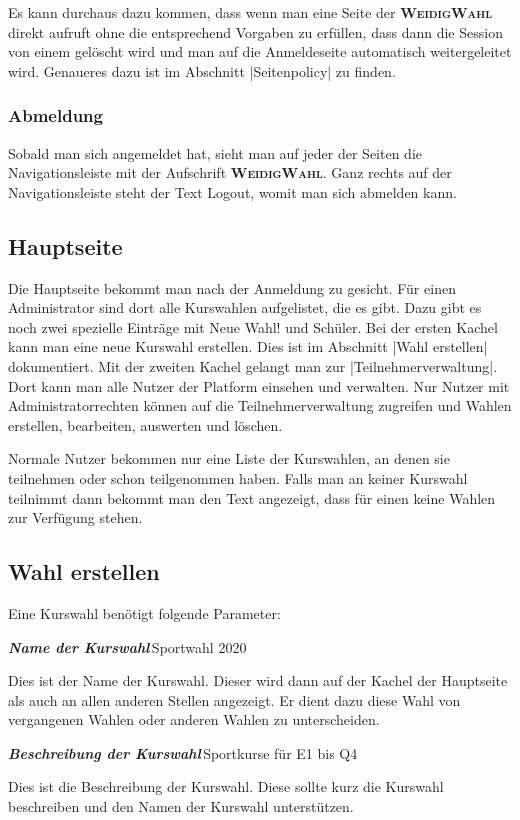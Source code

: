 \documentclass[ngerman]{ltxdoc}
\newcommand{\DescribeOption}[4]{
  \DescribeMacro{#1}
  \begin{minipage}[t]{\textwidth}
    \textit{\textbf{\textcolor{mLightGreen}{#2}}}\dotfill\,#3\par
    \begingroup
    \vspace{0.5em}#4\par
    \endgroup
  \end{minipage}
}
\newcommand{\name}{\textbf{\textsc{WeidigWahl}}\xspace}
\begin{document}
Es kann durchaus dazu kommen, dass wenn man eine Seite der \name direkt aufruft
ohne die entsprechend Vorgaben zu erfüllen, dass dann die Session von einem
gelöscht wird und man auf die Anmeldeseite automatisch weitergeleitet wird.
Genaueres dazu ist im Abschnitt |Seitenpolicy| zu finden.

\subsubsection{Abmeldung}

Sobald man sich angemeldet hat, sieht man auf jeder der Seiten die Navigationsleiste
mit der Aufschrift \name. Ganz rechts auf der Navigationsleiste steht der Text
\glqq Logout\grqq{}, womit man sich abmelden kann.

\subsection{Hauptseite}

Die Hauptseite bekommt man nach der Anmeldung zu gesicht. Für einen Administrator
sind dort alle Kurswahlen aufgelistet, die es gibt. Dazu gibt es noch zwei spezielle
Einträge mit \glqq Neue Wahl!\grqq{} und \glqq Schüler\grqq{}. Bei der ersten Kachel
kann man eine neue Kurswahl erstellen. Dies ist im Abschnitt |Wahl erstellen|
dokumentiert. Mit der zweiten Kachel gelangt man zur |Teilnehmerverwaltung|.
Dort kann man alle Nutzer der Platform einsehen und verwalten. Nur Nutzer mit
Administratorrechten können auf die Teilnehmerverwaltung zugreifen und Wahlen erstellen,
bearbeiten, auswerten und löschen.

Normale Nutzer bekommen nur eine Liste der Kurswahlen, an denen sie teilnehmen oder
schon teilgenommen haben. Falls man an keiner Kurswahl teilnimmt dann bekommt
man den Text angezeigt, dass für einen keine Wahlen zur Verfügung stehen.

\subsection{Wahl erstellen}

Eine Kurswahl benötigt folgende Parameter:

\DescribeOption{Name}{Name der Kurswahl}{Sportwahl 2020}{
  Dies ist der Name der Kurswahl. Dieser wird dann auf der Kachel der Hauptseite
  als auch an allen anderen Stellen angezeigt. Er dient dazu diese Wahl von
  vergangenen Wahlen oder anderen Wahlen zu unterscheiden.
}

\DescribeOption{Beschreibung}{Beschreibung der Kurswahl}{Sportkurse für E1 bis Q4}{
  Dies ist die Beschreibung der Kurswahl. Diese sollte kurz die Kurswahl beschreiben und
  den Namen der Kurswahl unterstützen.
}
\end{document}
